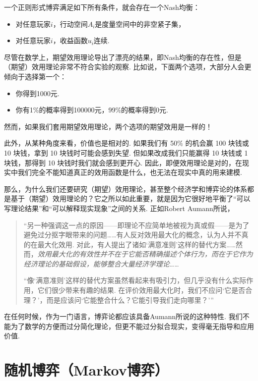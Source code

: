 \begin{theorem}[Glicksberg定理]
    一个正则形式博弈满足如下所有条件，就会存在一个Nash均衡：
    \begin{itemize}
        \item 对任意玩家$i$，行动空间$A_i$是度量空间中的非空紧子集，
        \item 对任意玩家$i$，收益函数$u_i$连续. 
    \end{itemize}
\end{theorem}

尽管在数学上，期望效用理论导出了漂亮的结果，即Nash均衡的存在性，但是（期望）效用理论非常不符合实验的观察. 比如说，下面两个选项，大部分人会更倾向于选择第一个：
\begin{itemize}
    \item 你得到1000元.
    \item 你有1\%的概率得到100000元，99\%的概率得到0元.
\end{itemize}
然而，如果我们套用期望效用理论，两个选项的期望效用是一样的！

此外，从某种角度来看，价值也是相对的. 如果我们有 50\% 的机会赢 100 块钱或 10 块钱，拿到 10 块钱时可能会感到失望. 但如果改成我们只能赢得 10 块钱或 1 块钱，那得到 10 块钱时我们就会感到更开心. 因此，即便效用理论是对的，在现实中我们完全不能知道真正的效用函数是什么，也无法在现实中真的用来建模.

那么，为什么我们还要研究（期望）效用理论，甚至整个经济学和博弈论的体系都是基于（期望）效用理论的？它之所以如此重要，就是因为它很好地平衡了“可以写理论结果”和“可以解释现实现象”之间的关系. 正如Robert Aumann所说，

\begin{quotation}
    “另一种强调这一点的原因——即理论不应简单地被视为真或假——是为了避免过分抠字眼带来的问题……有人反对效用最大化的概念，认为人并不真的在最大化效用. 对此，有人提出了诸如‘满意准则’这样的替代方案……然而，\emph{效用最大化的有效性并不在于它能否精确描述个体行为，而在于它作为经济理论的基础假设，能够整合大量经济学理论}……

    “像‘满意准则’这样的替代方案虽然看起来有吸引力，但几乎没有什么实际作用，它们很少带来有趣的结果. 在评价效用最大化时，我们不应问‘它是否合理？’，而是应该问‘它能整合什么？它能引导我们走向哪里？’”
\end{quotation}

在任何时候，作为一门语言，博弈论都应该具备Aumann所说的这种特性. 我们不能为了数学的方便而过分简化理论，但更不能过分拟合现实，变得毫无指导和应用价值.

\section{随机博弈（Markov博弈）}

